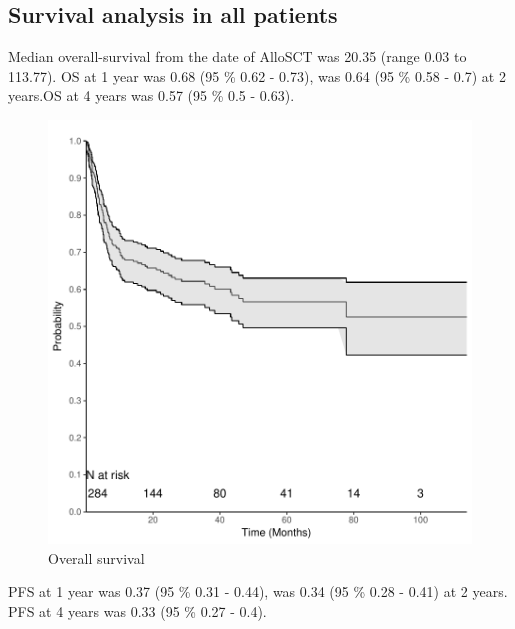 \documentclass[a4paper,11pt] {article}
\begin{document}
\subsection{Survival analysis in all patients}
Median overall-survival from the date of AlloSCT was 20.35 (range 0.03 to 113.77). OS at 1 year was 0.68 (95 \% 0.62 - 0.73), was 0.64 (95 \% 0.58 - 0.7) at 2 years.OS at 4 years was 0.57 (95 \% 0.5 - 0.63).
\begin{figure}[h]
\begin{center}
\includegraphics{Rapport-fig1}
\end{center}
\caption{Overall survival}
\label{fig1}
\end{figure}

\pagebreak
PFS at 1 year was 0.37 (95 \% 0.31 - 0.44), was 0.34 (95 \% 0.28 - 0.41) at 2 years. PFS at 4 years was 0.33 (95 \% 0.27 - 0.4).
\end{document}
